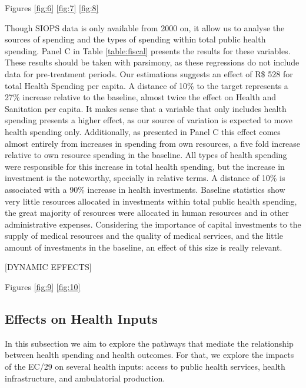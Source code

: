 Figures \ref{fig:6} \ref{fig:7} \ref{fig:8}









Though SIOPS data is only available from 2000 on, it allow us to analyse the sources of spending and the types of spending within total public health spending. Panel C in Table \ref{table:fiscal} presents the results for these variables. These results should be taken with parsimony, as these regressions do not include data for pre-treatment periods. Our estimations suggests an effect of R\$ 528 for total Health Spending per capita. A distance of 10\% to the target represents a 27\% increase relative to the baseline, almost twice the effect on Health and Sanitation per capita. It makes sense that a variable that only includes health spending presents a higher effect, as our source of variation is expected to move health spending only. Additionally, as presented in Panel C this effect comes almost entirely from increases in spending from own resources, a five fold increase relative to own resource spending in the baseline. All types of health spending were responsible for this increase in total health spending, but the increase in investment is the noteworthy, specially in relative terms. A distance of 10\% is associated with a 90\% increase in health investments. Baseline statistics show very little resources allocated in investments within total public health spending, the great majority of resources were allocated in human resources and in other administrative expenses. Considering the importance of capital investments to the supply of medical resources and the quality of medical services, and the little amount of investments in the baseline, an effect of this size is really relevant.

[DYNAMIC EFFECTS]

Figures \ref{fig:9} \ref{fig:10}






\subsection{Effects on Health Inputs}

In this subsection we aim to explore the pathways that mediate the relationship between health spending and health outcomes. For that, we explore the impacts of the EC/29 on several health inputs: access to public health services, health infrastructure, and ambulatorial production.

